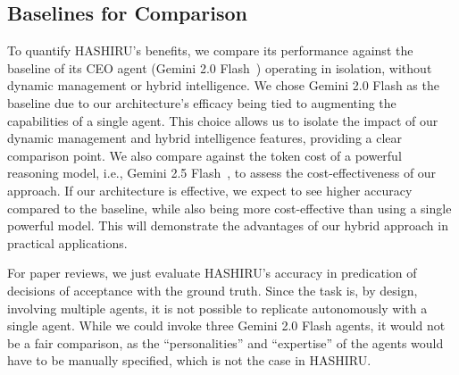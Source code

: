 \documentclass[conference]{IEEEtran}
\begin{document}
\subsection{Baselines for Comparison}
\label{subsec:baselines}
To quantify HASHIRU's benefits, we compare its performance against the baseline of its CEO agent (Gemini 2.0 Flash~\cite{gemini20flash}) operating in isolation, without dynamic management or hybrid intelligence.
We chose Gemini 2.0 Flash as the baseline due to our architecture's efficacy being tied to augmenting the capabilities of a single agent. This choice allows us to isolate the impact of our dynamic management and hybrid intelligence features, providing a clear comparison point.
We also compare against the token cost of a powerful reasoning model, i.e., Gemini 2.5 Flash~\cite{gemini25flash}, to assess the cost-effectiveness of our approach.
If our architecture is effective, we expect to see higher accuracy compared to the baseline, while also being more cost-effective than using a single powerful model. This will demonstrate the advantages of our hybrid approach in practical applications.

For paper reviews, we just evaluate HASHIRU's accuracy in predication of decisions of acceptance with the ground truth. Since the task is, by design, involving multiple agents, it is not possible to replicate autonomously with a single agent.
While we could invoke three Gemini 2.0 Flash agents, it would not be a fair comparison, as the ``personalities'' and ``expertise'' of the agents would have to be manually specified, which is not the case in HASHIRU.
\end{document}
